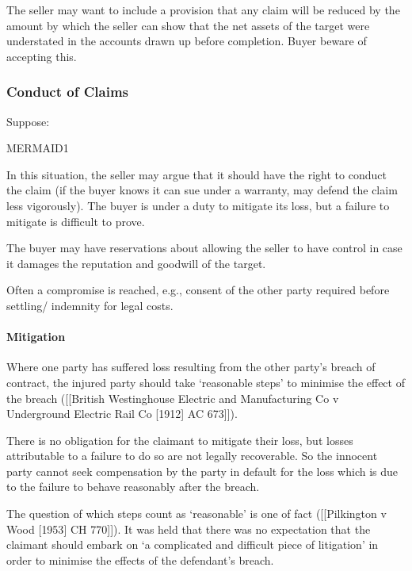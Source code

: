 \documentclass[
]{article}
\begin{document}
The seller may want to include a provision that any claim will be
reduced by the amount by which the seller can show that the net assets
of the target were understated in the accounts drawn up before
completion. Buyer beware of accepting this.

\hypertarget{conduct-of-claims}{%
\subsubsection{Conduct of Claims}\label{conduct-of-claims}}

Suppose:

MERMAID1

In this situation, the seller may argue that it should have the right to
conduct the claim (if the buyer knows it can sue under a warranty, may
defend the claim less vigorously). The buyer is under a duty to mitigate
its loss, but a failure to mitigate is difficult to prove.

The buyer may have reservations about allowing the seller to have
control in case it damages the reputation and goodwill of the target.

Often a compromise is reached, e.g., consent of the other party required
before settling/ indemnity for legal costs.

\hypertarget{mitigation}{%
\paragraph{Mitigation}\label{mitigation}}

Where one party has suffered loss resulting from the other party's
breach of contract, the injured party should take `reasonable steps' to
minimise the effect of the breach ({[}{[}British Westinghouse Electric
and Manufacturing Co v Underground Electric Rail Co {[}1912{]} AC
673{]}{]}).

There is no obligation for the claimant to mitigate their loss, but
losses attributable to a failure to do so are not legally recoverable.
So the innocent party cannot seek compensation by the party in default
for the loss which is due to the failure to behave reasonably after the
breach.

The question of which steps count as `reasonable' is one of fact
({[}{[}Pilkington v Wood {[}1953{]} CH 770{]}{]}). It was held that
there was no expectation that the claimant should embark on `a
complicated and difficult piece of litigation' in order to minimise the
effects of the defendant's breach.
\end{document}
